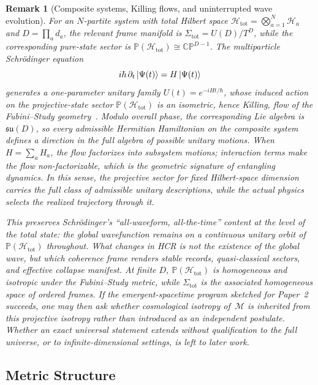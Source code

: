 \documentclass[aps,prd,twocolumn,superscriptaddress,nofootinbib,floatfix]{revtex4-2}
\newtheorem{remark}{Remark}
\newcommand{\HCR}{HCR}
\newcommand{\CR}{\HCR}  %
\begin{document}
\begin{remark}[Composite systems, Killing flows, and uninterrupted wave evolution]
For an $N$-partite system with total Hilbert space $\mathcal{H}_{\mathrm{tot}} = \bigotimes_{a=1}^N \mathcal{H}_a$ and $D = \prod_a d_a$, the relevant frame manifold is $\Sigma_{\mathrm{tot}} = U(D)/T^D$, while the corresponding pure-state sector is $\mathbb{P}(\mathcal{H}_{\mathrm{tot}}) \cong \mathbb{CP}^{D-1}$. The multiparticle Schr\"odinger equation
\begin{equation}
i\hbar \,\partial_t \ket{\Psi(t)} = H \ket{\Psi(t)}
\end{equation}
generates a one-parameter unitary family $U(t) = e^{-iHt/\hbar}$, whose induced action on the projective-state sector $\mathbb{P}(\mathcal{H}_{\mathrm{tot}})$ is an isometric, hence Killing, flow of the Fubini--Study geometry~\cite{Kibble1979,AshtekarSchilling1997}. Modulo overall phase, the corresponding Lie algebra is $\mathfrak{su}(D)$, so every admissible Hermitian Hamiltonian on the composite system defines a direction in the full algebra of possible unitary motions. When $H = \sum_a H_a$, the flow factorizes into subsystem motions; interaction terms make the flow non-factorizable, which is the geometric signature of entangling dynamics. In this sense, the projective sector for fixed Hilbert-space dimension carries the full class of admissible unitary descriptions, while the actual physics selects the realized trajectory through it.

This preserves Schr\"odinger's ``all-waveform, all-the-time'' content at the level of the total state: the global wavefunction remains on a continuous unitary orbit of $\mathbb{P}(\mathcal{H}_{\mathrm{tot}})$ throughout. What changes in \CR{} is not the existence of the global wave, but which coherence frame renders stable records, quasi-classical sectors, and effective collapse manifest. At finite $D$, $\mathbb{P}(\mathcal{H}_{\mathrm{tot}})$ is homogeneous and isotropic under the Fubini--Study metric, while $\Sigma_{\mathrm{tot}}$ is the associated homogeneous space of ordered frames. If the emergent-spacetime program sketched for Paper~2 succeeds, one may then ask whether cosmological isotropy of~$\mathcal{M}$ is inherited from this projective isotropy rather than introduced as an independent postulate. Whether an exact universal statement extends without qualification to the full universe, or to infinite-dimensional settings, is left to later work.
\end{remark}

\subsection{Metric Structure}\label{sec:metric}
\end{document}
